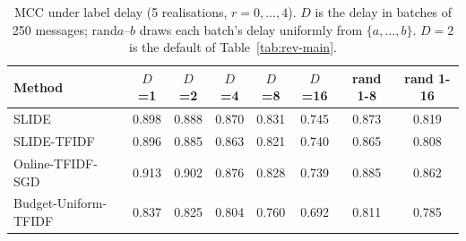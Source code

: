\begin{table}[t]
\centering
\caption{MCC under label delay (5 realisations, $r=0,\dots,4$). $D$ is the delay in batches of 250 messages; rand$a$--$b$ draws each batch's delay uniformly from $\{a,\dots,b\}$. $D=2$ is the default of Table~\ref{tab:rev-main}.}
\label{tab:rev-delay}
\scriptsize
\setlength{\tabcolsep}{3pt}
\begin{tabular}{@{}lccccccc@{}}
\toprule
Method & $D$=1 & $D$=2 & $D$=4 & $D$=8 & $D$=16 & rand 1-8 & rand 1-16 \\
\midrule
SLIDE & 0.898 & 0.888 & 0.870 & 0.831 & 0.745 & 0.873 & 0.819 \\
SLIDE-TFIDF & 0.896 & 0.885 & 0.863 & 0.821 & 0.740 & 0.865 & 0.808 \\
Online-TFIDF-SGD & 0.913 & 0.902 & 0.876 & 0.828 & 0.739 & 0.885 & 0.862 \\
Budget-Uniform-TFIDF & 0.837 & 0.825 & 0.804 & 0.760 & 0.692 & 0.811 & 0.785 \\
\bottomrule
\end{tabular}
\end{table}
